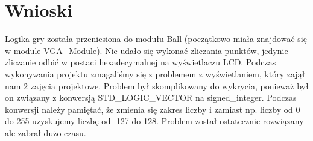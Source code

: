 \documentclass[12pt,a4paper]{article}
\begin{document}
\section{Wnioski}
Logika gry została przeniesiona do modułu Ball (początkowo miała znajdować się w module VGA\_Module). Nie udało się wykonać zliczania punktów, jedynie zliczanie odbić w postaci hexadecymalnej na wyświetlaczu LCD. Podczas wykonywania projektu zmagaliśmy się z problemem z wyświetlaniem, który zajął nam 2 zajęcia projektowe. Problem był skomplikowany do wykrycia, ponieważ był on związany z konwersją STD\_LOGIC\_VECTOR na signed\_integer. Podczas konwersji należy pamiętać, że zmienia się zakres liczby i zamiast np. liczby od 0 do 255 uzyskujemy liczbę od -127 do 128. Problem został ostatecznie rozwiązany ale zabrał dużo czasu.
\end{document}
